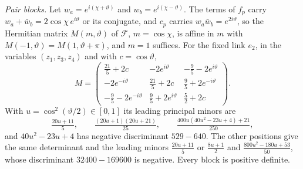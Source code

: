 \documentclass[11pt]{amsart}
\theoremstyle{definition}
\theoremstyle{remark}
\numberwithin{equation}{section}
\begin{document}
\emph{Pair blocks.} Let $w_a=e^{i(\chi+\vartheta)}$ and $w_b=e^{i(\chi-\vartheta)}$. The
terms of $f_p$ carry $w_a+\bar w_b=2\cos\chi\,e^{i\vartheta}$ or its conjugate, and
$c_p$ carries $w_a\bar w_b=e^{2i\vartheta}$, so the Hermitian matrix $M(m,\vartheta)$ of
$\mathcal F$, $m=\cos\chi$, is affine in $m$ with $M(-1,\vartheta)=M(1,\vartheta+\pi)$,
and $m=1$ suffices. For the fixed link $e_2$, in the variables $(z_1,z_3,z_4)$
and with $c=\cos\vartheta$,
\[
M=\begin{pmatrix}\frac{21}5+2c&-2e^{i\vartheta}&-\frac95-2e^{i\vartheta}\\[2pt]
-2e^{-i\vartheta}&\frac{21}5+2c&\frac95+2e^{-i\vartheta}\\[2pt]
-\frac95-2e^{-i\vartheta}&\frac95+2e^{i\vartheta}&\frac52+2c\end{pmatrix}.
\]
With $u=\cos^2(\vartheta/2)\in[0,1]$ its leading principal minors are
\[
\tfrac{20u+11}5,\qquad\tfrac{(20u+1)(20u+21)}{25},\qquad
\tfrac{400u(40u^2-23u+4)+21}{250},
\]
and $40u^2-23u+4$ has negative discriminant $529-640$. The other positions give
the same determinant and the leading minors $\frac{20u+11}5$ or $\frac{8u+1}2$
and $\frac{800u^2-180u+53}{50}$, whose discriminant $32400-169600$ is negative.
Every block is positive definite.
\end{document}

